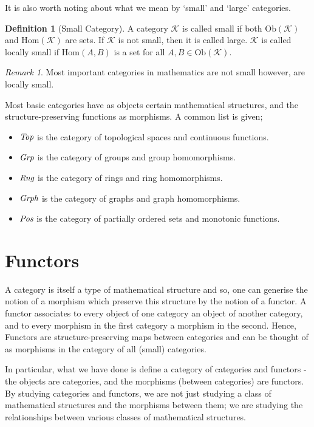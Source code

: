 \documentclass[10pt, oneside, reqno]{amsart}
\theoremstyle{plain}%
\theoremstyle{definition}
\newtheorem{defn}[thm]{Definition}
\theoremstyle{remark}
\newtheorem*{rem}{Remark}
\newcommand{\Cat}{\mathcal{K}}
\begin{document}
It is also worth noting about what we mean by `small' and `large' categories.

\begin{defn}[Small Category]
	A category $\Cat$ is called small if both $\text{Ob}(\Cat)$ and $\text{Hom}(\Cat)$ are sets.
	If $\Cat$ is not small, then it is called large.
	$\Cat$ is called locally small if $\text{Hom}(A,B)$ is a set for all $A, B \in \text{Ob}(\Cat)$.
\end{defn}

\begin{rem}
	Most important categories in mathematics are not small however, are locally small.
\end{rem}

Most basic categories have as objects certain mathematical structures, and the structure-preserving
functions as morphisms. A common list is given;
\begin{itemize}
\item $\emph{Top}$ is the category of topological spaces and continuous functions.
\item $\emph{Grp}$ is the category of groups and group homomorphisms.
\item $\emph{Rng}$ is the category of rings and ring homomorphisms.
\item $\emph{Grph}$ is the category of graphs and graph homomorphisms.
\item $\emph{Pos}$ is the category of partially ordered sets and monotonic functions.
\end{itemize}


\section{Functors} %
\label{sec:functors}
A category is itself a type of mathematical structure and so, one can generise the notion of a morphism which preserve this structure by the notion of a
functor.
A functor associates to every object of one category an object of another category, and to every morphism in the first category a morphism in the second.
Hence, Functors are structure-preserving maps between categories and can be thought of as morphisms in the category of all (small) categories.

In particular, what we have done is define a category of categories and functors - the objects are categories, and the morphisms (between categories) are functors.
By studying categories and functors, we are not just studying a class of mathematical structures and the morphisms between them;
we are studying the relationships between various classes of mathematical structures.
\end{document}
